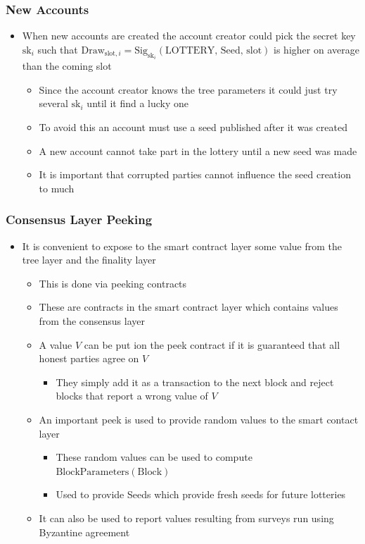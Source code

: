 \documentclass[11pt]{article}
\begin{document}
\subsubsection{New Accounts}
\label{sec:orgcae374f}
\begin{itemize}
\item When new accounts are created the account creator could pick the secret key \(\text{sk}_i\) such that \(\text{Draw}_{\text{slot},i} = \text{Sig}_{\text{sk}_i}(\text{LOTTERY, Seed, slot})\) is higher on average than the coming slot
\begin{itemize}
\item Since the account creator knows the tree parameters it could just try several \(\text{sk}_i\) until it find a lucky one
\item To avoid this an account must use a seed published after it was created
\item A new account cannot take part in the lottery until a new seed was made
\item It is important that corrupted parties cannot influence the seed creation to much
\end{itemize}
\end{itemize}

\subsubsection{Consensus Layer Peeking}
\label{sec:org0f368b8}
\begin{itemize}
\item It is convenient to expose to the smart contract layer some value from the tree layer and the finality layer
\begin{itemize}
\item This is done via peeking contracts
\item These are contracts in the smart contract layer which contains values from the consensus layer
\item A value \(V\) can be put ion the peek contract if it is guaranteed that all honest parties agree on \(V\)
\begin{itemize}
\item They simply add it as a transaction to the next block and reject blocks that report a wrong value of \(V\)
\end{itemize}
\item An important peek is used to provide random values to the smart contact layer
\begin{itemize}
\item These random values can be used to compute \(\text{BlockParameters}(\text{Block})\)
\item Used to provide Seeds which provide fresh seeds for future lotteries
\end{itemize}
\item It can also be used to report values resulting from surveys run using Byzantine agreement
\end{itemize}
\end{itemize}
\end{document}
